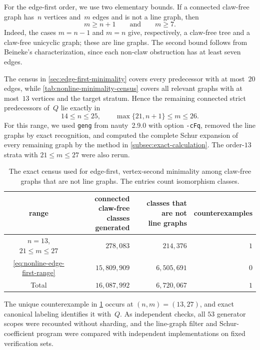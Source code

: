 \documentclass[11pt]{amsart}
\numberwithin{equation}{section}
\theoremstyle{remark}
\begin{document}
For the edge-first order, we use two elementary bounds.  If a connected
claw-free graph has~$n$ vertices and~$m$ edges and is not a line graph,
then
\[
m\ge n+1
\qquad\text{and}\qquad
m\ge7.
\]
Indeed, the cases $m=n-1$ and $m=n$ give, respectively, a claw-free tree
and a claw-free unicyclic graph; these are line graphs.  The second bound
follows from Beineke's characterization, since each non-claw obstruction
has at least seven edges.

The census in \cref{sec:edge-first-minimality} covers every predecessor
with at most~$20$ edges, while
\cref{tab:nonline-minimality-census} covers all relevant graphs with at
most~$13$ vertices and the target stratum.  Hence the remaining connected
strict predecessors of~$Q$ lie exactly in
\begin{equation}\label{eq:nonline-edge-first-range}
14\le n\le25,\qquad
\max\{21,n+1\}\le m\le26.
\end{equation}
For this range, we used \texttt{geng} from nauty~2.9.0 with option
\texttt{-cFq}, removed the line graphs by exact recognition, and computed
the complete Schur expansion of every remaining graph by the method in
\cref{subsec:exact-calculation}.  The order-$13$ strata with
$21\le m\le27$ were also rerun.

\begin{table}[H]
\centering
\small
\begingroup
\setlength{\tabcolsep}{5pt}
\begin{tabular}{@{}crrr@{}}
\toprule
range
& \shortstack[c]{connected claw-free\\classes generated}
& \shortstack[c]{classes that are not\\line graphs}
& counterexamples\\
\midrule
$n=13$, $21\le m\le27$
& $278{,}083$
& $214{,}376$
& $1$\\
\eqref{eq:nonline-edge-first-range}
& $15{,}809{,}909$
& $6{,}505{,}691$
& $0$\\
\midrule
Total
& $16{,}087{,}992$
& $6{,}720{,}067$
& $1$\\
\bottomrule
\end{tabular}
\endgroup
\caption{The exact census used for edge-first, vertex-second minimality
among claw-free graphs that are not line graphs.  The entries count
isomorphism classes.}
\label{tab:nonline-edge-first-census}
\end{table}

The unique counterexample in
\cref{tab:nonline-edge-first-census} occurs at $(n,m)=(13,27)$, and exact
canonical labeling identifies it with~$Q$.  As independent checks, all
$53$ generator scopes were recounted without sharding, and the line-graph
filter and Schur-coefficient program were compared with independent
implementations on fixed verification sets.
\end{document}
